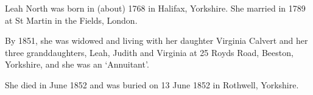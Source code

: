 
Leah North was born in (about) 1768 in Halifax, Yorkshire. She married  in 1789 at St Martin in the Fields, London.

By 1851, she was widowed and living with her daughter Virginia Calvert and her three granddaughters, Leah, Judith and Virginia at 25 Royds Road, Beeston, Yorkshire, and she was an `Annuitant'.\cite{LNorth1851}

She died in June 1852 and was buried on 13 June 1852 in Rothwell, Yorkshire.\cite{LNorthDeath}
